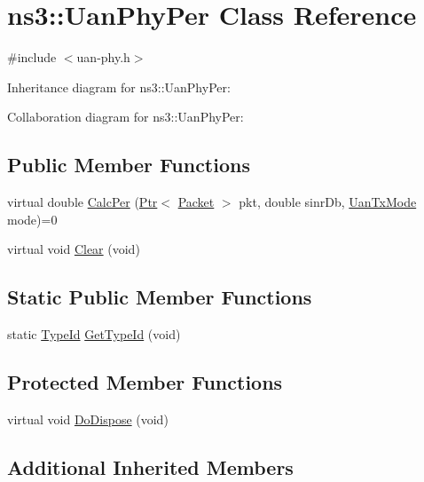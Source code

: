 \hypertarget{classns3_1_1UanPhyPer}{}\section{ns3\+:\+:Uan\+Phy\+Per Class Reference}
\label{classns3_1_1UanPhyPer}


{\ttfamily \#include $<$uan-\/phy.\+h$>$}



Inheritance diagram for ns3\+:\+:Uan\+Phy\+Per\+:


Collaboration diagram for ns3\+:\+:Uan\+Phy\+Per\+:
\subsection*{Public Member Functions}
\begin{DoxyCompactItemize}
\item 
virtual double \hyperlink{classns3_1_1UanPhyPer_abda67b8507b942f2f6d043297242181f}{Calc\+Per} (\hyperlink{classns3_1_1Ptr}{Ptr}$<$ \hyperlink{classns3_1_1Packet}{Packet} $>$ pkt, double sinr\+Db, \hyperlink{classns3_1_1UanTxMode}{Uan\+Tx\+Mode} mode)=0
\item 
virtual void \hyperlink{classns3_1_1UanPhyPer_ad9f1e120c600dc4de0ae4fcc64252605}{Clear} (void)
\end{DoxyCompactItemize}
\subsection*{Static Public Member Functions}
\begin{DoxyCompactItemize}
\item 
static \hyperlink{classns3_1_1TypeId}{Type\+Id} \hyperlink{classns3_1_1UanPhyPer_a0cd16a3c663d4903edacc63e53c35d98}{Get\+Type\+Id} (void)
\end{DoxyCompactItemize}
\subsection*{Protected Member Functions}
\begin{DoxyCompactItemize}
\item 
virtual void \hyperlink{classns3_1_1UanPhyPer_ad6540824108373ad3f0919d5300dff7d}{Do\+Dispose} (void)
\end{DoxyCompactItemize}
\subsection*{Additional Inherited Members}


